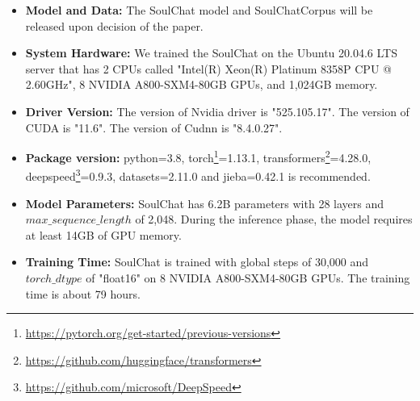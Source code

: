 \documentclass[11pt]{article}
\begin{document}
\begin{itemize}
  \item
  \textbf{Model and Data:} The SoulChat model and SoulChatCorpus will be released upon decision of the paper.
  \item
  \textbf{System Hardware:} We trained the SoulChat on the Ubuntu 20.04.6 LTS server that has 2 CPUs called "Intel(R) Xeon(R) Platinum 8358P CPU @ 2.60GHz", 8 NVIDIA A800-SXM4-80GB GPUs, and 1,024GB memory.
  \item
  \textbf{Driver Version:} The version of Nvidia driver is "525.105.17". The version of CUDA is "11.6". The version of Cudnn is "8.4.0.27".
  \item
  \textbf{Package version:} python=3.8, torch\footnote{\url{https://pytorch.org/get-started/previous-versions}}=1.13.1, transformers\footnote{\url{https://github.com/huggingface/transformers}}=4.28.0, deepspeed\footnote{\url{https://github.com/microsoft/DeepSpeed}}=0.9.3, datasets=2.11.0 and jieba=0.42.1 is recommended.
  \item
  \textbf{Model Parameters:} SoulChat has 6.2B parameters with 28 layers and $max\_sequence\_length$ of 2,048. During the inference phase, the model requires at least 14GB of GPU memory.
  \item
  \textbf{Training Time:} SoulChat is trained with global steps of 30,000 and $torch\_dtype$ of "float16" on 8 NVIDIA A800-SXM4-80GB GPUs. The training time is about 79 hours.
  
  
\end{itemize}
\end{document}
